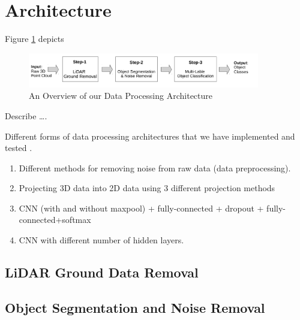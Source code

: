 \section{Architecture}\label{sec:Architecture}








Figure \ref{fig:dataPipeline} depicts  

\begin{figure}[h!]
 \begin{center}
   \includegraphics[width=0.9\textwidth]{./images/DataProcessingPipleline.pdf}
   \caption{An Overview of our Data Processing Architecture}
   \label{fig:dataPipeline}
 \end{center}
\end{figure}





Describe \ldots. 

Different forms of data processing architectures that we have implemented and tested . 

\begin{enumerate}
  \item Different methods for removing noise from raw data (data preprocessing). 
  \item Projecting 3D data into 2D data using 3 different projection methods 
  \item CNN  (with and without maxpool) + fully-connected + dropout + fully-connected+softmax
  \item CNN with different number of hidden layers. 

\end{enumerate}





\subsection{LiDAR Ground Data Removal}
% 

















\subsection{Object Segmentation and Noise Removal}










